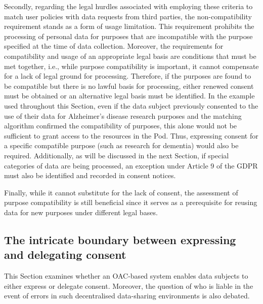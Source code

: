 Secondly, regarding the legal hurdles associated with employing these criteria to match user policies with data requests from third parties, the non-compatibility requirement stands as a form of usage limitation.
This requirement prohibits the processing of personal data for purposes that are incompatible with the purpose specified at the time of data collection.
Moreover, the requirements for compatibility and usage of an appropriate legal basis are conditions that must be met together, i.e., while purpose compatibility is important, it cannot compensate for a lack of legal ground for processing.
Therefore, if the purposes are found to be compatible but there is no lawful basis for processing, either renewed consent must be obtained or an alternative legal basis must be identified.
In the example used throughout this Section, even if the data subject previously consented to the use of their data for Alzheimer's disease research purposes and the matching algorithm confirmed the compatibility of purposes, this alone would not be sufficient to grant access to the resources in the Pod.
Thus, expressing consent for a specific compatible purpose (such as research for dementia) would also be required.
Additionally, as will be discussed in the next Section, if special categories of data are being processed, an exception under Article 9 of the GDPR \citeyearpar{noauthor_regulation_2016} must also be identified and recorded in consent notices.

Finally, while it cannot substitute for the lack of consent, the assessment of purpose compatibility is still beneficial since it serves as a prerequisite for reusing data for new purposes under different legal bases.

\subsection{The intricate boundary between expressing and delegating consent}
\label{sec:consent_delegating}

This Section examines whether an OAC-based system enables data subjects to either express or delegate consent.
Moreover, the question of who is liable in the event of errors in such decentralised data-sharing environments is also debated.

